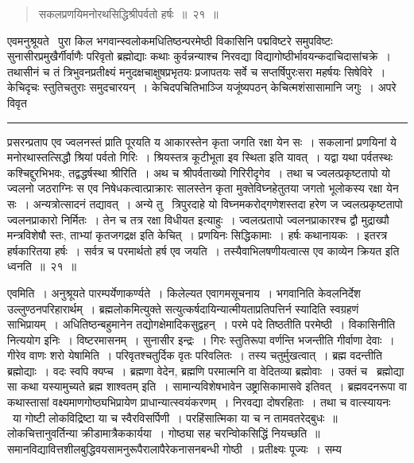 \documentclass[11pt, openany]{book}
\begin{document}
\newpage

\begin{quote}
{\ha सकलप्रणयिमनोरथसिद्धिश्रीपर्वतो हर्षः~॥~२१~॥}
\end{quote}

\vspace{-3mm}
एवमनुश्रूयते \textendash\ पुरा किल भगवान्स्वलोकमधितिष्ठन्परमेष्ठी विकासिनि पद्मविष्टरे समुपविष्टः सुनासीरप्रमुखैर्गीर्वाणैः परिवृतो ब्रह्मोद्याः कथाः कुर्वन्नन्याश्च निरवद्या विद्यागोष्ठीर्भावयन्कदाचिदासांचक्रे~। तथासीनं च तं त्रिभुवनप्रतीक्ष्यं मनुदक्षचाक्षुषप्रभृतयः प्रजापतयः सर्वे च सप्तर्षिपुरःसरा महर्षयः सिषेविरे~। केचिदृचः स्तुतिचतुराः समुदचारयन्~। केचिदपचितिभाञ्जि यजूंष्यपठन् केचित्मशंसासामानि जगुः~। अपरे विवृत\textendash

\vspace{2mm}
\hrule

\noindent
{\s प्रसरन्प्रताप एव ज्वलनस्तं प्राति पूरयति य आकारस्तेन कृता जगति रक्षा येन सः~। सकलानां प्रणयिनां ये मनोरथास्तत्सिद्धौ श्रियां पर्वतो गिरिः~। श्रियस्तत्र कूटीभूता इव स्थिता इति यावत्~। यद्वा यथा पर्वतस्थः कश्चिद्दुरभिभवः, तद्वद्धर्षस्था श्रीरिति~। अथ च श्रीपर्वताख्यो गिरिरीदृगेव~। तथा च ज्वलत्प्रकृष्टतापो यो ज्वलनो जठराग्निः स एव निषेधकत्वात्प्राक्रारः सालस्तेन कृता मुक्तेविघ्नहेतुतया जगतो भूलोकस्य रक्षा येन सः~। अन्यत्रोत्सादनं तद्यावत्~। अन्ये तु \textendash\ त्रिपुरदाहे यो विघ्नमकरोद्गणेशस्तदा हरेण ज ज्वलत्प्रकृष्टतापो ज्वलनप्राकारो निर्मितः~। तेन च तत्र रक्षा विधीयत इत्याहुः~। ज्वलत्प्रतापो ज्वलनप्राकारश्च द्वौ मुद्राख्पौ मन्त्रविशेषौ स्तः, ताभ्यां कृतजगद्रक्ष इति केचित्~। प्रणयिनः सिद्धिकामाः~। हर्षः कथानायकः~। इतरत्र हर्षकारितया हर्षः~। सर्वत्र च परमार्थतो हर्ष एव जयति~। तस्यैवाभिलषणीयत्वात्स एव काव्येन क्रियत इति ध्वनति~॥~२१~॥

{\qtt एवमिति}~। अनुश्रूयते पारम्पर्येणाकर्ण्यते~। किलेल्यत एवागमसूचनाय~। भगवानिति केवलनिर्देश उल्लुण्ठनपरिहारार्थम्~। ब्रह्मलोकमित्युक्ते सत्युत्कर्षदायिन्यात्मीयताप्रतिपत्तिर्न स्यादिति स्वग्रहणं साभिप्रायम्~। अधितिष्ठन्बहुमानेन तद्योगक्षेमादिकसुद्वहन्~। परमे पदे तिष्ठतीति परमेष्ठी~। विकासिनीति नित्ययोग इनिः~। विष्टरमासनम्~। सुनासीर इन्द्रः~। गिरः स्तुतिरूपा वर्णन्ति भजन्तीति गीर्वाणा देवाः~। गीरेव वाणः शरो येषामिति~। परिवृतश्चतुर्दिक वृतः परिवलितः~। तस्य चतुर्मुखत्वात्~। ब्रह्म वदन्तीति ब्रह्मोद्याः~। {\qt वदः स्वपि क्यप्च}~। ब्रह्मणा वेदेन, ब्रह्मणि परमात्मनि वा वेदितव्या ब्रह्मोवाः~। उक्तं च \textendash\ ब्रह्मोद्या सा कथा यस्यामुच्यते ब्रह्म शाश्वतम् इति~। सामान्यविशेषभावेन {\qt उष्ट्रासिकामासवे} इतिवत्~। ब्रह्मवदनरूपा वा कथास्तासां वक्ष्यमाणगोष्ठ्यभिप्रायेण प्राधान्यात्स्वयंकरणम्~। निरवद्या दोषरहिताः~। तथा च वात्स्यायनः \textendash\ {\qt या गोष्टी लोकविद्रिष्टा या च स्वैरविसर्पिणी~। परहिंसात्मिका या च न तामवतरेद्बुधः~॥ लोकचित्तानुवर्तिन्या क्रीडामात्रैककार्यया~। गोष्ठ्या सह चरन्विोकसिद्धिं नियच्छति~॥} समानविद्यावित्तशीलबुद्धिवयसामनुरूपैरालापैरेकनासनबन्धी गोष्ठी~। प्रतीक्ष्यः पूज्यः~। सम्य\textendash }
\end{document}
